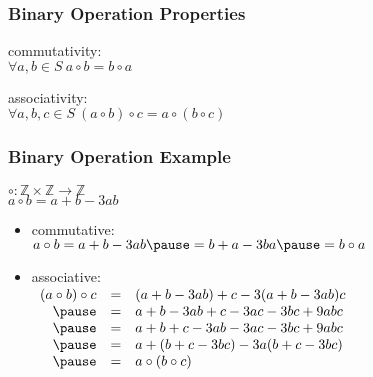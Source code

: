 \documentclass[dvipsnames]{beamer}
\begin{document}
\begin{frame}
  \frametitle{Binary Operation Properties}

  \begin{definition}
    \alert{commutativity}:\\
    $\forall a,b \in S~a \circ b = b \circ a$
  \end{definition}

  \pause
  \begin{definition}
    \alert{associativity}:\\
    $\forall a,b,c \in S~(a \circ b) \circ c = a \circ (b \circ c)$
  \end{definition}
\end{frame}

\begin{frame}
  \frametitle{Binary Operation Example}

  \begin{example}
    $\circ: \mathbb{Z} \times \mathbb{Z} \rightarrow \mathbb{Z}$\\
    $a \circ b = a + b - 3ab$

    \pause
    \medskip
    \begin{itemize}
      \item commutative:\\
        $a \circ b = a + b - 3ab \pause
                   = b + a - 3ba \pause
                   = b \circ a$

      \pause
      \medskip
      \item associative:\\
        $\begin{array}{rcl}
          (a \circ b) \circ c & = & (a + b - 3ab) + c - 3 (a + b - 3ab) c\\ \pause
                              & = & a + b - 3ab + c - 3ac - 3bc + 9abc\\ \pause
                              & = & a + b + c - 3ab - 3ac - 3bc + 9abc\\ \pause
                              & = & a + (b + c - 3bc) - 3 a (b + c - 3bc)\\ \pause
                              & = & a \circ (b \circ c)
        \end{array}$
     \end{itemize}
 \end{example}
\end{frame}
\end{document}
